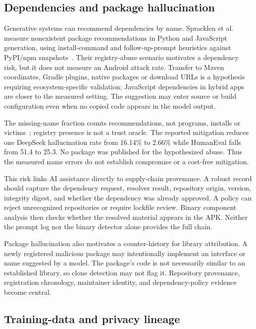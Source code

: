 \subsection{Dependencies and package hallucination}

Generative systems can recommend dependencies by name. Spracklen et al. measure nonexistent package recommendations in Python and JavaScript generation, using install-command and follow-up-prompt heuristics against PyPI/npm snapshots~\cite{spracklen}. Their registry-abuse scenario motivates a dependency risk, but it does not measure an Android attack rate. Transfer to Maven coordinates, Gradle plugins, native packages or download URLs is a hypothesis requiring ecosystem-specific validation; JavaScript dependencies in hybrid apps are closer to the measured setting. The suggestion may enter source or build configuration even when no copied code appears in the model output.

The missing-name fraction counts recommendations, not programs, installs or victims~\cite{spracklen}; registry presence is not a trust oracle. The reported mitigation reduces one DeepSeek hallucination rate from 16.14\% to 2.66\% while HumanEval falls from 51.4 to 25.3. No package was published for the hypothesized abuse. Thus the measured name errors do not establish compromise or a cost-free mitigation.

This risk links AI assistance directly to supply-chain provenance. A robust record should capture the dependency request, resolver result, repository origin, version, integrity digest, and whether the dependency was already approved. A policy can reject unrecognized repositories or require lockfile review. Binary component analysis then checks whether the resolved material appears in the APK. Neither the prompt log nor the binary detector alone provides the full chain.

Package hallucination also motivates a counter-history for library attribution. A newly registered malicious package may intentionally implement an interface or name suggested by a model. The package's code is not necessarily similar to an established library, so clone detection may not flag it. Repository provenance, registration chronology, maintainer identity, and dependency-policy evidence become central.

\subsection{Training-data and privacy lineage}

